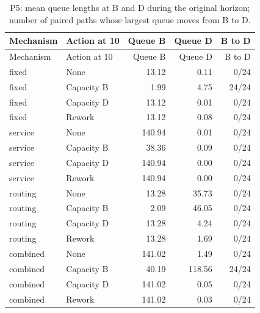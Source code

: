 \begin{longtable}{llrrr}\caption{P5: mean queue lengths at B and D during the original horizon; number of paired paths whose largest queue moves from B to D.}\\\toprule

Mechanism & Action at 10 & Queue B & Queue D & B to D\\\midrule\endfirsthead

\toprule Mechanism & Action at 10 & Queue B & Queue D & B to D\\\midrule\endhead

fixed & None & 13.12 & 0.11 & 0/24\\

fixed & Capacity B & 1.99 & 4.75 & 24/24\\

fixed & Capacity D & 13.12 & 0.01 & 0/24\\

fixed & Rework & 13.12 & 0.08 & 0/24\\

service & None & 140.94 & 0.01 & 0/24\\

service & Capacity B & 38.36 & 0.09 & 0/24\\

service & Capacity D & 140.94 & 0.00 & 0/24\\

service & Rework & 140.94 & 0.00 & 0/24\\

routing & None & 13.28 & 35.73 & 0/24\\

routing & Capacity B & 2.09 & 46.05 & 0/24\\

routing & Capacity D & 13.28 & 4.24 & 0/24\\

routing & Rework & 13.28 & 1.69 & 0/24\\

combined & None & 141.02 & 1.49 & 0/24\\

combined & Capacity B & 40.19 & 118.56 & 24/24\\

combined & Capacity D & 141.02 & 0.05 & 0/24\\

combined & Rework & 141.02 & 0.03 & 0/24\\

\bottomrule\end{longtable}
